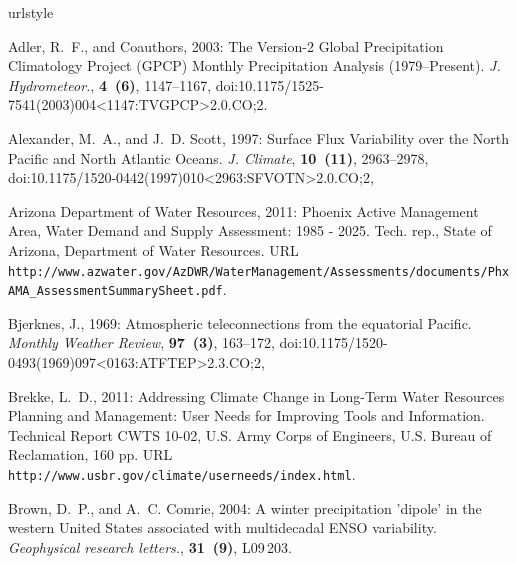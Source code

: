 \documentclass[final, double]{ua-thesis}
\begin{document}
\begin{thebibliography}{}
\providecommand{\natexlab}[1]{#1}
\providecommand{\url}[1]{\texttt{#1}}
\renewcommand{\UrlFont}{\rmfamily}
\providecommand{\urlprefix}{URL }
\expandafter\ifx\csname urlstyle\endcsname\relax
  \providecommand{\doi}[1]{doi:\discretionary{}{}{}#1}\else
  \providecommand{\doi}{doi:\discretionary{}{}{}\begingroup
  \urlstyle{rm}\Url}\fi
\providecommand{\eprint}[2][]{\url{#2}}

Adler, R.~F., and Coauthors, 2003: The {Version}-2 {Global} {Precipitation}
  {Climatology} {Project} ({GPCP}) {Monthly} {Precipitation} {Analysis}
  (1979–{Present}). \textit{J. Hydrometeor.}, \textbf{4~(6)}, 1147--1167,
  \doi{10.1175/1525-7541(2003)004<1147:TVGPCP>2.0.CO;2}.

Alexander, M.~A., and J.~D. Scott, 1997: Surface {Flux} {Variability} over the
  {North} {Pacific} and {North} {Atlantic} {Oceans}. \textit{J. Climate},
  \textbf{10~(11)}, 2963--2978,
  \doi{10.1175/1520-0442(1997)010<2963:SFVOTN>2.0.CO;2},

{Arizona Department of Water Resources}, 2011: Phoenix {Active} {Management}
  {Area}, {Water} {Demand} and {Supply} {Assessment}: 1985 - 2025. Tech. rep.,
  State of Arizona, Department of Water Resources.
  \urlprefix\url{http://www.azwater.gov/AzDWR/WaterManagement/Assessments/documents/PhxAMA_AssessmentSummarySheet.pdf}.

Bjerknes, J., 1969: Atmospheric teleconnections from the equatorial {Pacific}.
  \textit{Monthly Weather Review}, \textbf{97~(3)}, 163--172,
  \doi{10.1175/1520-0493(1969)097<0163:ATFTEP>2.3.CO;2},

Brekke, L.~D., 2011: Addressing {Climate} {Change} in {Long}-{Term} {Water}
  {Resources} {Planning} and {Management}: {User} {Needs} for {Improving}
  {Tools} and {Information}. Technical {Report} CWTS 10-02, U.S. Army Corps of
  Engineers, U.S. Bureau of Reclamation, 160 pp.
  \urlprefix\url{http://www.usbr.gov/climate/userneeds/index.html}.

Brown, D.~P., and A.~C. Comrie, 2004: A winter precipitation 'dipole' in the
  western {United} {States} associated with multidecadal {ENSO} variability.
  \textit{Geophysical research letters.}, \textbf{31~(9)}, L09\,203.


\end{thebibliography}
\end{document}
